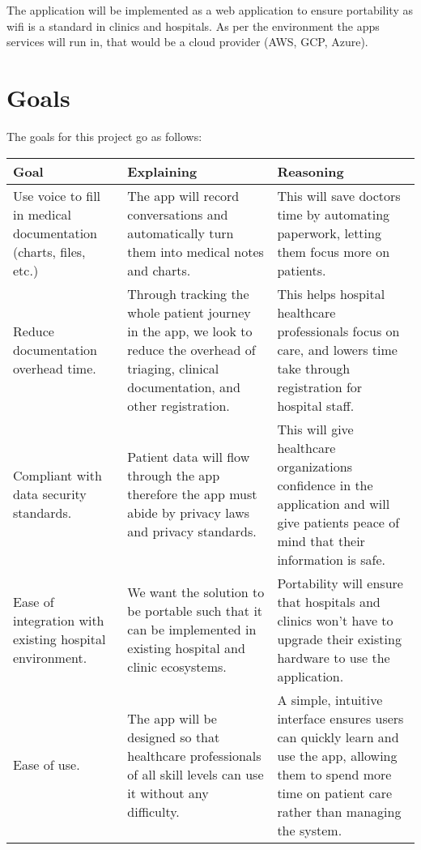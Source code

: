 \documentclass{article}
\begin{document}

The application will be implemented as a web application to ensure portability as wifi is a standard in clinics and hospitals. As per the environment the apps services will run in, that would be a cloud provider (AWS, GCP, Azure). 

\section{Goals}

The goals for this project go as follows:

\begin{table}[H]
    \centering
    \begin{tabular}{p{4cm} p{4cm} p{4cm}}
        \toprule
        \textbf{Goal} & \textbf{Explaining} & \textbf{Reasoning} \\
        \midrule
        Use voice to fill in medical documentation (charts, files, etc.) & The app will record conversations and automatically turn them into medical notes and charts. & This will save doctors time by automating paperwork, letting them focus more on patients. \\
        \midrule
        Reduce documentation overhead time.  & Through tracking the whole patient journey in the app, we look to reduce the overhead of triaging, clinical documentation, and other registration.  & This helps hospital healthcare professionals focus on care, and lowers time take through registration for hospital staff. \\ 
        \midrule
        Compliant with data security standards.  & Patient data will flow through the app therefore the app must abide by privacy laws and privacy standards. & This will give healthcare organizations confidence in the application and will give patients peace of mind that their information is safe. \\
        \midrule 
        Ease of integration with existing hospital environment. & We want the solution to be portable such that it can be implemented in existing hospital and clinic ecosystems.  & Portability will ensure that hospitals and clinics won’t have to upgrade their existing hardware to use the application. \\
        \midrule 
        Ease of use. & The app will be designed so that healthcare professionals of all skill levels can use it without any difficulty. & A simple, intuitive interface ensures users can quickly learn and use the app, allowing them to spend more time on patient care rather than managing the system. \\
        \bottomrule
    \end{tabular}
\end{table}
\end{document}

